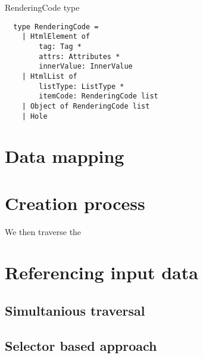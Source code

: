 \begin{listing}[H]
	\caption {RenderingCode type}
	\begin{lstlisting}
  type RenderingCode =
    | HtmlElement of 
        tag: Tag * 
        attrs: Attributes * 
        innerValue: InnerValue
    | HtmlList of 
        listType: ListType * 
        itemCode: RenderingCode list
    | Object of RenderingCode list
    | Hole 
  \end{lstlisting}
\end{listing}

\section{Data mapping}
\section{Creation process}


We then traverse the

\section{Referencing input data}
\subsection{Simultanious traversal}
\subsection{Selector based approach}
